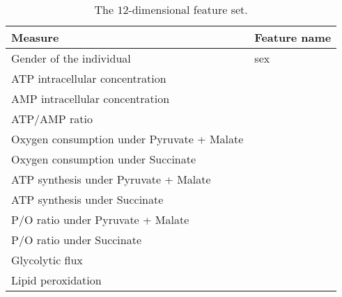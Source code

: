 \begin{table}[]
	\centering
	\caption{The $12$-dimensional feature set.}
	\label{tab:aging_features}
	\begin{tabular}{@{}ll@{}}
		\toprule
		\textbf{Measure}                                    & \textbf{Feature name}\\ \midrule
		Gender of the individual                      & sex          \\
		ATP intracellular concentration            & \atp         \\
		AMP intracellular concentration            & \amp         \\
		ATP/AMP ratio                              & \atpamp      \\
		Oxygen consumption under Pyruvate + Malate & \copyrmal    \\
		Oxygen consumption under Succinate         & \cosucc      \\
		ATP synthesis under Pyruvate + Malate      & \atppyrmal   \\
		ATP synthesis under Succinate              & \atpsucc     \\
		P/O ratio under Pyruvate + Malate          & \popyrmal    \\
		P/O ratio under Succinate                  & \posucc      \\
		Glycolytic flux                            & \ldh         \\
		Lipid peroxidation                         & \mda         \\ \bottomrule
	\end{tabular}
\end{table}



